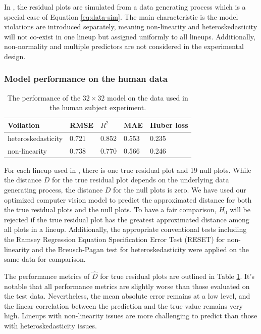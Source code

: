 \documentclass[]{interact}
\theoremstyle{plain}%
\theoremstyle{definition}
\theoremstyle{remark}
\begin{document}
In \citet{li2023plot}, the residual plots are simulated from a data
generating process which is a special case of Equation
\ref{eq:data-sim}. The main characteristic is the model violations are
introduced separately, meaning non-linearity and heteroskedasticity will
not co-exist in one lineup but assigned uniformly to all lineups.
Additionally, non-normality and multiple predictors are not considered
in the experimental design.

\subsubsection{Model performance on the human
data}\label{model-performance-on-the-human-data}

\begin{table}

\caption{\label{tab:experiment-performance}The performance of the $32 \times 32$ model on the data used in the human subject experiment.}
\centering
\begin{tabular}[t]{lllll}
\toprule
Voilation & RMSE & $R^2$ & MAE & Huber loss\\
\midrule
heteroskedasticity & 0.721 & 0.852 & 0.553 & 0.235\\
non-linearity & 0.738 & 0.770 & 0.566 & 0.246\\
\bottomrule
\end{tabular}
\end{table}

For each lineup used in \citet{li2023plot}, there is one true residual
plot and 19 null plots. While the distance \(D\) for the true residual
plot depends on the underlying data generating process, the distance
\(D\) for the null plots is zero. We have used our optimized computer
vision model to predict the approximated distance for both the true
residual plots and the null plots. To have a fair comparison, \(H_0\)
will be rejected if the true residual plot has the greatest approximated
distance among all plots in a lineup. Additionally, the appropriate
conventional tests including the Ramsey Regression Equation
Specification Error Test (RESET) \citep{ramsey1969tests} for
non-linearity and the Breusch-Pagan test \citep{breusch1979simple} for
heteroskedasticity were applied on the same data for comparison.

The performance metrics of \(\hat{D}\) for true residual plots are
outlined in Table \ref{tab:experiment-performance}. It's notable that
all performance metrics are slightly worse than those evaluated on the
test data. Nevertheless, the mean absolute error remains at a low level,
and the linear correlation between the prediction and the true value
remains very high. Lineups with non-linearity issues are more
challenging to predict than those with heteroskedasticity issues.
\end{document}
